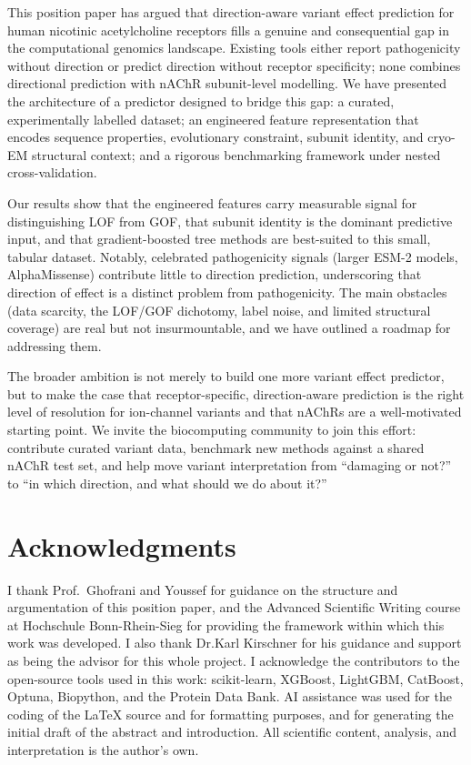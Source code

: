 \documentclass{ws-procs11x85}
\begin{document}
This position paper has argued that direction-aware variant effect
prediction for human nicotinic acetylcholine receptors fills a genuine
and consequential gap in the computational genomics landscape. Existing
tools either report pathogenicity without direction or predict direction
without receptor specificity; none combines directional prediction
with nAChR subunit-level modelling. We have presented the architecture
of a predictor designed to bridge this gap: a curated, experimentally
labelled dataset; an engineered feature representation that encodes
sequence properties, evolutionary constraint, subunit identity, and
cryo-EM structural context; and a rigorous benchmarking framework under
nested cross-validation.

Our results show that the engineered features carry measurable signal
for distinguishing LOF from GOF, that subunit identity is the dominant
predictive input, and that gradient-boosted tree methods are best-suited
to this small, tabular dataset. Notably, celebrated pathogenicity
signals (larger ESM-2 models, AlphaMissense) contribute little to
direction prediction, underscoring that direction of effect is a
distinct problem from pathogenicity. The main obstacles (data scarcity,
the LOF/GOF dichotomy, label noise, and limited structural coverage)
are real but not insurmountable, and we have outlined a roadmap for
addressing them.

The broader ambition is not merely to build one more variant effect
predictor, but to make the case that receptor-specific, direction-aware
prediction is the right level of resolution for ion-channel variants
and that nAChRs are a well-motivated starting point. We invite the
biocomputing community to join this effort: contribute curated variant
data, benchmark new methods against a shared nAChR test set, and help
move variant interpretation from ``damaging or not?'' to ``in which
direction, and what should we do about it?''

\section*{Acknowledgments}

I thank Prof.\ Ghofrani and Youssef for guidance on the structure and
argumentation of this position paper, and the Advanced Scientific
Writing course at Hochschule Bonn-Rhein-Sieg for providing the
framework within which this work was developed. I also thank Dr.Karl Kirschner for his guidance and support as being the advisor for this whole project. I acknowledge the
contributors to the open-source tools used in this work: scikit-learn,
XGBoost, LightGBM, CatBoost, Optuna, Biopython, and the Protein Data
Bank. AI assistance was used for the coding of the \LaTeX{} source and
for formatting purposes, and for generating the initial draft of the abstract and introduction. All scientific content, analysis, and interpretation is the author's own.
\end{document}
